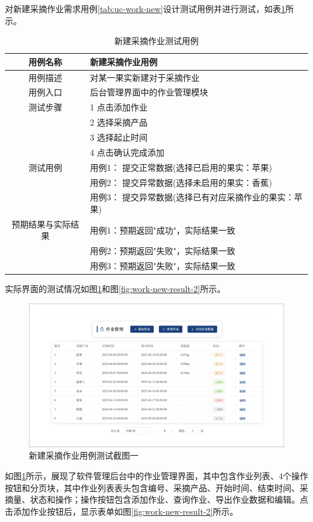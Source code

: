 对新建采摘作业需求用例\ref{tab:uc-work-new}设计测试用例并进行测试，如表\ref{tab:uc-work-new-test}所示。

\begin{longtable}[ht]{|c|p{8cm}|}
\caption{新建采摘作业测试用例}
\label{tab:uc-work-new-test}
\\
\hline
用例名称 & 新建采摘作业用例 \\
\hline
用例描述 & 对某一果实新建对于采摘作业 \\
\hline
用例入口 & 后台管理界面中的作业管理模块 \\
\hline
测试步骤 & 1 点击添加作业 \\
& 2 选择采摘产品 \\
& 3 选择起止时间 \\
& 4 点击确认完成添加 \\
\hline
测试用例 & 用例1： 提交正常数据(选择已启用的果实：苹果) \\
& 用例2： 提交异常数据(选择未启用的果实：香蕉) \\
& 用例3： 提交异常数据(选择已有对应采摘作业的果实：苹果) \\
\hline
预期结果与实际结果 & 用例1：预期返回"成功"，实际结果一致 \\
& 用例2：预期返回"失败"，实际结果一致 \\
& 用例3：预期返回"失败"，实际结果一致 \\
\hline
\end{longtable}

实际界面的测试情况如图\ref{fig:work-new-result-1}和图\ref{fig:work-new-result-2}所示。

\begin{figure}[H]
    \centering
    \includegraphics[width=0.8\linewidth]{../result/work-new-result-1.png}
    \caption{新建采摘作业用例测试截图一}
    \label{fig:work-new-result-1}
\end{figure}

如图\ref{fig:work-new-result-1}所示，展现了软件管理后台中的作业管理界面，其中包含作业列表、4个操作按钮和分页块，其中作业列表表头包含编号、采摘产品、开始时间、结束时间、采摘量、状态和操作；操作按钮包含添加作业、查询作业、导出作业数据和编辑。点击添加作业按钮后，显示表单如图\ref{fig:work-new-result-2}所示。

